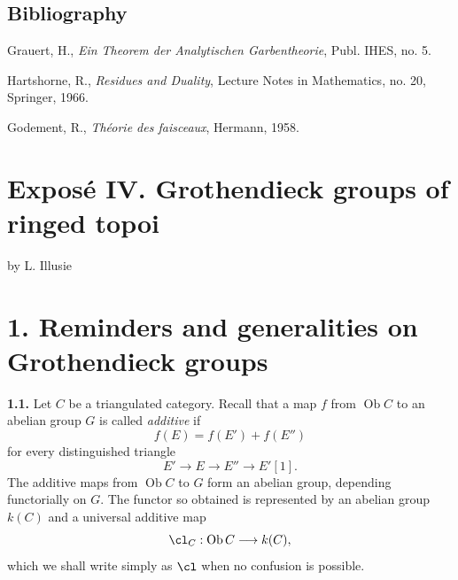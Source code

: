 \subsection*{Bibliography}
\begin{enumerate}[label={[\arabic*]}]
\item Grauert, H., \emph{Ein Theorem der Analytischen Garbentheorie}, Publ. IHES, no. 5.
\item Hartshorne, R., \emph{Residues and Duality}, Lecture Notes in Mathematics, no. 20, Springer, 1966.
\item Godement, R., \emph{Théorie des faisceaux}, Hermann, 1958.
\end{enumerate}



\providecommand{\Ob}{\operatorname{Ob}}
\providecommand{\Mod}{\operatorname{Mod}}
\providecommand{\Coh}{\operatorname{Coh}}
\providecommand{\Loclib}{\operatorname{Loclib}}
\providecommand{\coh}{\mathrm{coh}}
\providecommand{\parf}{\mathrm{parf}}
\providecommand{\naif}{\mathrm{naif}}
\providecommand{\loc}{\mathrm{loc}}
\providecommand{\fin}{\mathrm{fin}}
\providecommand{\clA}{\operatorname{cl}}
\providecommand{\Rg}{\operatorname{rg}}
\providecommand{\varinjlim}{\varinjlim}
\providecommand{\varprojlim}{\varprojlim}
\providecommand{\id}{\operatorname{id}}
\providecommand{\Th}{\operatorname{Th}}
\providecommand{\Hom}{\operatorname{Hom}}
\providecommand{\Dcat}{\mathrm D}
\providecommand{\Kcat}{\mathrm K}
\providecommand{\Kdot}{K_{\bullet}}
\providecommand{\Kprime}{K'}
\providecommand{\naif}{\mathrm{na\ddot{\i}f}}


\section*{Exposé IV. Grothendieck groups of ringed topoi}
\begin{center}
by L. Illusie
\end{center}

\section*{1. Reminders and generalities on Grothendieck groups}

\textbf{1.1.} Let \(C\) be a triangulated category. Recall that a map \(f\) from \(\Ob C\) to an abelian group \(G\) is called \emph{additive} if
\[
 f(E)=f(E')+f(E'')
\]
for every distinguished triangle
\[
 E'\longrightarrow E\longrightarrow E''\longrightarrow E'[1].
\]
The additive maps from \(\Ob C\) to \(G\) form an abelian group, depending functorially on \(G\). The functor so obtained is represented by an abelian group \(k(C)\) and a universal additive map
\[
 \cl_C:\Ob C\longrightarrow k(C),
\]
which we shall write simply as \(\cl\) when no confusion is possible.

